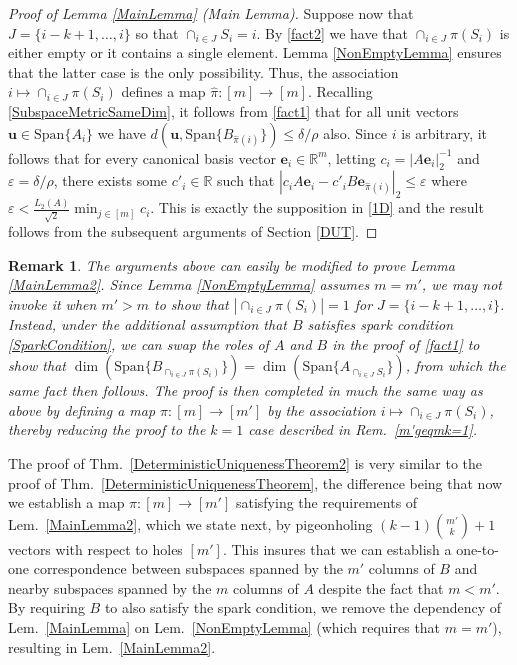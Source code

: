 \documentclass[journal, twocolumn]{IEEEtran}
\newtheorem{remark}{Remark}
\begin{document}
\begin{proof}[Proof of Lemma \ref{MainLemma} (Main Lemma)]
Suppose now that $J = \{i-k+1, \ldots, i\}$ so that $\cap_{i \in J} S_i = i$. By \eqref{fact2} we have that $\cap_{i \in J} \pi(S_i)$ is either empty or it contains a single element. Lemma \ref{NonEmptyLemma} ensures that the latter case is the only possibility. Thus, the association $i \mapsto \cap_{i \in J} \pi(S_i)$ defines a map $\hat \pi: [m] \to [m]$. Recalling \eqref{SubspaceMetricSameDim}, it follows from \eqref{fact1} that for all unit vectors $\mathbf{u} \in \text{Span}\{A_i\}$ we have $d\left( \mathbf{u}, \text{Span}\{B_{\hat \pi(i)}\}\right) \leq \delta/\rho$ also. Since $i$ is arbitrary, it follows that for every canonical basis vector $\mathbf{e}_i \in \mathbb{R}^m$, letting $c_i = |A\mathbf{e}_i|_2^{-1}$ and $\varepsilon = \delta/\rho$, there exists some $c'_i \in \mathbb{R}$ such that $|c_iA\mathbf{e}_i - c'_iB\mathbf{e}_{\hat \pi(i)}|_2 \leq \varepsilon$ where $\varepsilon < \frac{L_2(A)}{\sqrt{2}} \min_{j \in [m]} c_i$. This is exactly the supposition in \eqref{1D} and the result follows from the subsequent arguments of Section \ref{DUT}. 
\end{proof}

\begin{remark}
The arguments above can easily be modified to prove Lemma \ref{MainLemma2}. Since Lemma \ref{NonEmptyLemma} assumes $m = m'$, we may not invoke it when $m' > m$ to show that $|\cap_{i \in J} \pi(S_i)| = 1$ for $J = \{i-k+1, \ldots, i\}$. Instead, under the additional assumption that $B$ satisfies spark condition \eqref{SparkCondition}, we can swap the roles of $A$ and $B$ in the proof of \eqref{fact1} to show that $\dim(\text{Span}\{B_{\cap_{i \in J}\pi(S_i)}\}) = \dim(\text{Span}\{A_{\cap_{i \in J} S_i}\})$, from which the same fact then follows. The proof is then completed in much the same way as above by defining a map $\pi: [m] \to [m']$ by the association $i \mapsto \cap_{i \in J} \pi(S_i)$, thereby reducing the proof to the $k=1$ case described in Rem.~\ref{m'geqmk=1}.
\end{remark}


The proof of Thm.~\ref{DeterministicUniquenessTheorem2} is very similar to the proof of Thm.~\ref{DeterministicUniquenessTheorem}, the difference being that now we establish a map $\pi: [m] \to [m']$ satisfying the requirements of Lem.~\ref{MainLemma2}, which we state next, by pigeonholing $(k-1){m' \choose k} + 1$ vectors with respect to holes $[m']$. This insures that we can establish a one-to-one correspondence between subspaces spanned by the $m'$ columns of $B$ and nearby subspaces spanned by the $m$ columns of $A$ despite the fact that $m < m'$. By requiring $B$ to also satisfy the spark condition, we remove the dependency of Lem.~\ref{MainLemma} on Lem.~\ref{NonEmptyLemma} (which requires that $m = m'$), resulting in Lem.~\ref{MainLemma2}.
\end{document}

